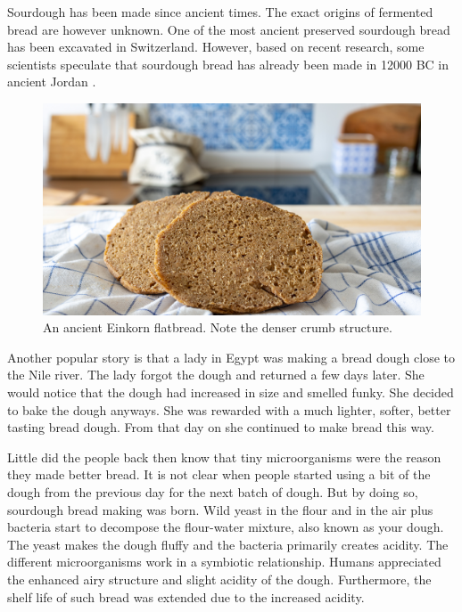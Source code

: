 Sourdough has been made since ancient times. The exact origins
of fermented bread are however unknown. One of the most ancient
preserved sourdough bread has been excavated in Switzerland.
However, based on recent research, some scientists speculate
that sourdough bread has already been made in 12000 BC in ancient
Jordan \cite{jordan+bread}.

\begin{figure}[h]
  \includegraphics[width=\textwidth]{einkorn-crumb}
  \caption{An ancient Einkorn flatbread. Note the denser crumb structure.}
  \label{einkorn-crumb}
\end{figure}

Another popular story is that a lady in Egypt was making
a bread dough close to the Nile river. The lady forgot the
dough and returned a few days later. She would notice that
the dough had increased in size and smelled funky. She decided
to bake the dough anyways. She was rewarded with a much
lighter, softer, better tasting bread dough. From that day
on she continued to make bread this way.

Little did the people back then know that tiny microorganisms
were the reason they made better bread. It is not clear when
people started using a bit of the dough from the previous
day for the next batch of dough. But by doing so, sourdough
bread making was born. Wild yeast in the flour and in the air
plus bacteria start to decompose the flour-water mixture, also
known as your dough. The yeast makes the dough fluffy and
the bacteria primarily creates acidity. The different
microorganisms work in a symbiotic relationship. Humans
appreciated the enhanced airy structure and slight acidity
of the dough. Furthermore, the shelf life of such bread
was extended due to the increased acidity. 


